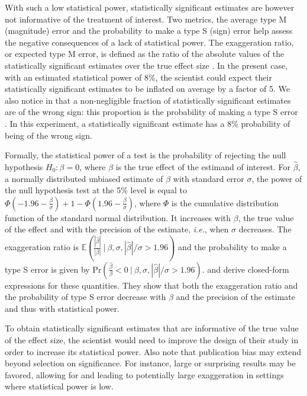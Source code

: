 \documentclass[12pt]{article}
\begin{document}
    With such a low statistical power, statistically significant estimates are however not informative of the treatment of interest. Two metrics, the average type M (magnitude) error and the probability to make a type S (sign) error help assess the negative consequences of a lack of statistical power. The exaggeration ratio, or expected type M error, is defined as the ratio of the absolute values of the statistically significant estimates over the true effect size \citep{gelman_beyond_2014}. In the present case, with an estimated statistical power of 8\%, the scientist could expect their statistically significant estimates to be inflated on average by a factor of 5. We also notice in  that a non-negligible fraction of statistically significant estimates are of the wrong sign: this proportion is the probability of making a type S error \citep{gelmanType2000}. In this experiment, a statistically significant estimate has a 8\% probability of being of the wrong sign. 
    
    Formally, the statistical power of a test is the probability of rejecting the null hypothesis $H_{0}: \beta = 0$, where $\beta$ is the true effect of the estimand of interest. For $\hat{\beta}$, a normally distributed unbiased estimate of $\beta$ with standard error $\sigma$, the power of the null hypothesis test at the 5\% level is equal to $\Phi\left(-1.96-\frac{\beta}{\sigma}\right)+1-\Phi\left(1.96-\frac{\beta}{\sigma}\right)$, where $\Phi$ is the cumulative distribution function of the standard normal distribution. It increases with $\beta$, the true value of the effect and with the precision of the estimate, \textit{i.e.}, when $\sigma$ decreases. The exaggeration ratio is $\mathbb{E}\left(\frac{|\hat{\beta}|}{|\beta|} \ \bigg| \ \beta, \sigma, |\hat{\beta}|/\sigma>1.96\right)$ and the probability to make a type S error is given by $\text{Pr}\left(\frac{\hat{\beta}}{\beta} < 0 \ \bigg| \ \beta, \sigma, |\hat{\beta}|/\sigma>1.96 \right)$.  \cite{zwet_significance_2021} and \cite{lu_note_2019} derive closed-form expressions for these quantities. They show that both the exaggeration ratio and the probability of type S error decrease with $\beta$ and the precision of the estimate and thus with statistical power. %

    To obtain statistically significant estimates that are informative of the true value of the effect size, the scientist would need to improve the design of their study in order to increase its statistical power. %
    Also note that publication bias may extend beyond selection on significance. For instance, large or surprising results may be favored, allowing for and leading to potentially large exaggeration in settings where statistical power is low. 
    
\end{document}
